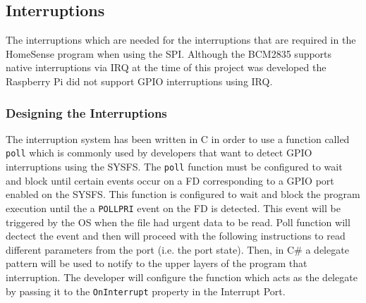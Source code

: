\subsection{Interruptions}\label{SS:IOSharp-Interrupt}
The interruptions which are needed for the interruptions that are required in the HomeSense program when using the \gls{SPI}. Although the \gls{BCM2835} supports native interruptions via \gls{IRQ} at the time of this project was developed the Raspberry Pi did not support GPIO interruptions using \gls{IRQ}.

\subsubsection{Designing the Interruptions}\label{SSS:IOSharp-Interrupt-Design}
The interruption system has been written in C in order to use a function called \verb!poll! which is commonly used by developers that want to detect GPIO interruptions using the SYSFS. The \verb!poll! function must be configured to wait and block until certain events occur on a \gls{FD} corresponding to a GPIO port enabled on the SYSFS. This function is configured to wait and block the program execution until the a \verb!POLLPRI! event on the \gls{FD} is detected. This event will be triggered by the OS when the file had urgent data to be read. Poll function will dectect the event and then will proceed with the following instructions to read different parameters from the port (i.e. the port state). Then, in C\# a delegate pattern will be used to notify to the upper layers of the program that interruption. The developer will configure the function which acts as the delegate by passing it to the \verb!OnInterrupt! property in the Interrupt Port.

